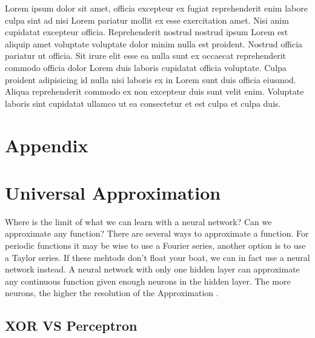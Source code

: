 \documentclass[twoside,11pt]{report}
\begin{document}
Lorem ipsum dolor sit amet, officia excepteur ex fugiat reprehenderit enim labore culpa sint ad nisi Lorem pariatur mollit ex esse exercitation amet. Nisi anim cupidatat excepteur officia. Reprehenderit nostrud nostrud ipsum Lorem est aliquip amet voluptate voluptate dolor minim nulla est proident. Nostrud officia pariatur ut officia. Sit irure elit esse ea nulla sunt ex occaecat reprehenderit commodo officia dolor Lorem duis laboris cupidatat officia voluptate. Culpa proident adipisicing id nulla nisi laboris ex in Lorem sunt duis officia eiusmod. Aliqua reprehenderit commodo ex non excepteur duis sunt velit enim. Voluptate laboris sint cupidatat ullamco ut ea consectetur et est culpa et culpa duis.
























%
\newpage

\appendix
{}%
\section*{Appendix}
\label{app:appendix}


\section{Universal Approximation}
\label{sec:UAT}

Where is the limit of what we can learn with a neural network? Can we approximate any function?
There are several ways to approximate a function. For periodic functions it may be wise to use a Fourier series,
another option is to use a Taylor series. If these mehtods don't float your boat, we can in fact use a neural network
instead. A neural network with only one hidden layer can approximate any continuous function
given enough neurons in the hidden layer. The more neurons, the higher the resolution of the Approximation
\cite{HornikEtAl89}. 

%
\subsection*{XOR VS Perceptron}
\label{app:xor}
\end{document}
